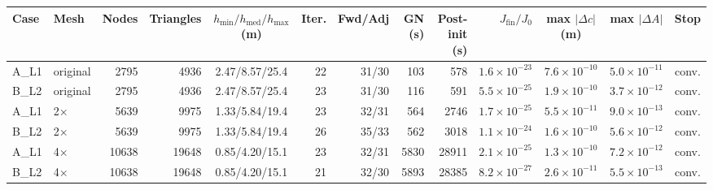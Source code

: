 \begin{tabular}{llrrcrrrrrccc}
\toprule
Case & Mesh & Nodes & Triangles & $h_{\min}/h_{\mathrm{med}}/h_{\max}$ (m) & Iter. & Fwd/Adj & GN (s) & Post-init (s) & $J_{\mathrm{fin}}/J_0$ & max $|\Delta c|$ (m) & max $|\Delta A|$ & Stop \\
\midrule
A\_L1 & original & 2795 & 4936 & 2.47/8.57/25.4 & 22 & 31/30 & 103 & 578 & $1.6\times10^{-23}$ & $7.6\times10^{-10}$ & $5.0\times10^{-11}$ & conv. \\
B\_L2 & original & 2795 & 4936 & 2.47/8.57/25.4 & 23 & 31/30 & 116 & 591 & $5.5\times10^{-25}$ & $1.9\times10^{-10}$ & $3.7\times10^{-12}$ & conv. \\
A\_L1 & 2$\times$ & 5639 & 9975 & 1.33/5.84/19.4 & 23 & 32/31 & 564 & 2746 & $1.7\times10^{-25}$ & $5.5\times10^{-11}$ & $9.0\times10^{-13}$ & conv. \\
B\_L2 & 2$\times$ & 5639 & 9975 & 1.33/5.84/19.4 & 26 & 35/33 & 562 & 3018 & $1.1\times10^{-24}$ & $1.6\times10^{-10}$ & $5.6\times10^{-12}$ & conv. \\
A\_L1 & 4$\times$ & 10638 & 19648 & 0.85/4.20/15.1 & 23 & 32/31 & 5830 & 28911 & $2.1\times10^{-25}$ & $1.3\times10^{-10}$ & $7.2\times10^{-12}$ & conv. \\
B\_L2 & 4$\times$ & 10638 & 19648 & 0.85/4.20/15.1 & 21 & 32/30 & 5893 & 28385 & $8.2\times10^{-27}$ & $2.6\times10^{-11}$ & $5.5\times10^{-13}$ & conv. \\
\bottomrule
\end{tabular}

